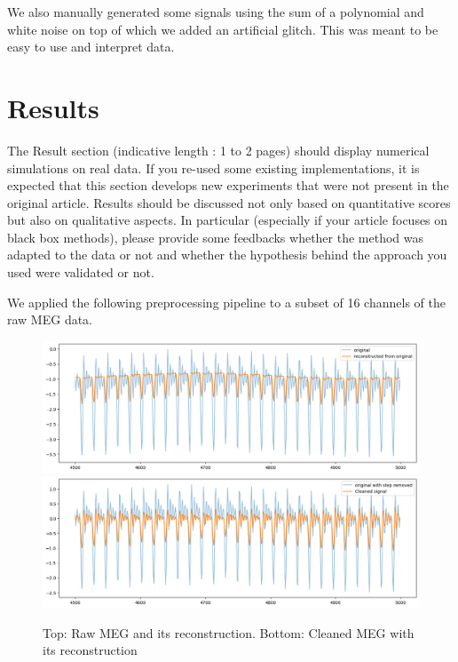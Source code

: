 \documentclass[11pt]{article}
\begin{document}
We also manually generated some signals using the sum of a polynomial and white noise on top of which we added an artificial glitch. This was meant to be easy to use and interpret data.\\ 

\section{Results}
The Result section (indicative length : 1 to 2 pages) should display numerical simulations on real data. If you re-used some existing implementations, it is expected that this section develops new experiments that were not present in the original article. Results should be discussed not only based on quantitative scores but also on qualitative aspects. In particular (especially if your article focuses on black box methods), please provide some feedbacks whether the method was adapted to the data or not and whether the hypothesis behind the approach you used were validated or not.

We applied the following preprocessing pipeline to a subset of 16 channels of the raw MEG data.

\begin{figure}
    \centering
    \includegraphics[width=12cm]{recons.png}\\
    \includegraphics[width=12cm]{recons_clean.png}
    \caption{Top: Raw MEG and its reconstruction. Bottom: Cleaned MEG with its reconstruction}
\end{figure}

\newpage

\printbibliography[heading=bibintoc]
\end{document}

